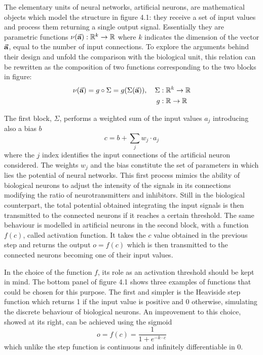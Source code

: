 \documentclass[a4paper,10pt]{report}
\begin{document}
The elementary units of neural networks, artificial neurons, are mathematical objects
which model the structure in figure 4.1: they receive a set of input values
and process them returning a single output signal.
Essentially they are parametric functions $\nu(\va a): \mathbb R ^k \rightarrow \mathbb R$ 
where $k$ indicates the dimension of the vector $\va a$, equal to the number of input connections.
To explore the arguments behind their design and unfold the
comparison with the biological unit, this relation can be rewritten 
as the composition of two functions corresponding to the two blocks in figure:
\begin{align}
    \nu (\va a) = g \circ \Sigma = g(\Sigma (\va a)), \hspace{10pt}
    \Sigma &: \mathbb R^k \rightarrow \mathbb R \\
    g &: \mathbb R \rightarrow \mathbb R \nonumber
\end{align}

The first block, $\Sigma$, performs a weighted sum of the input values $a_{j}$ introducing also a bias $b$
\begin{equation}
   c = b + \sum_j w_{j} \cdot a_{j} 
\end{equation}
where the $j$ index identifies the input connections of the artificial neuron considered.
The weights $w_{j}$ and the bias constitute the set of parameters in which
lies the potential of neural networks.
This first process mimics the ability of biological neurons to adjust the intensity of the signals in its connections
modifying the ratio of neurotransmitters and inhibitors.
Still in the biological counterpart, the total potential obtained integrating the input signals is then transmitted to the 
connected neurons if it reaches a certain threshold.
The same behaviour is modelled in artificial neurons in the second block, 
with a function $f(c)$, called activation function. It takes the $c$ value obtained in the
previous step and returns the output $o = f(c)$ which is then transmitted to the connected neurons 
becoming one of their input values.

In the choice of the function $f$, its role as an activation threshold should be kept in mind.
The bottom panel of figure 4.1 shows three examples of functions that could be chosen for this purpose.
The first and simpler is the Heaviside step function which
returns 1 if the input value is positive and 0 otherwise, simulating the discrete behaviour of 
biological neurons.
An improvement to this choice, showed at its right, can be achieved using the sigmoid
\begin{equation}
    o = f(c) = \frac{1}{1+e^{-k\cdot c}}
\end{equation}
which unlike the step function is continuous and infinitely differentiable in 0.
\end{document}
